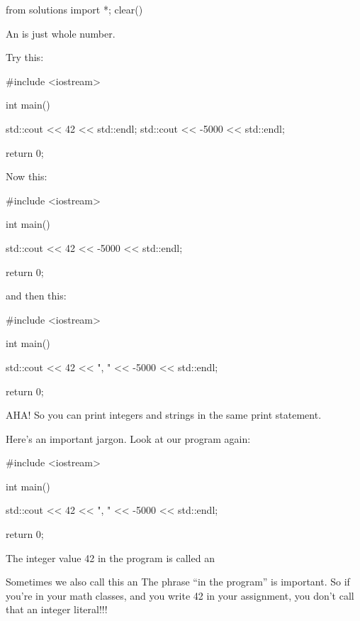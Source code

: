 \begin{python0}
from solutions import *; clear()
\end{python0}

An  is just whole number.

Try this:
\begin{console}
#include <iostream>
  
int main()
{
    std::cout << 42 << std::endl;
    std::cout << -5000 << std::endl;
    
    return 0;
}
\end{console}

Now this:
\begin{console}
#include <iostream>
  
int main()
{
    std::cout << 42 << -5000 << std::endl;
    
    return 0;
}
\end{console}

and then this:
\begin{console}
#include <iostream>
  
int main()
{
    std::cout << 42 << ", " << -5000 << std::endl;
    
    return 0;
}
\end{console}

AHA! So you can print integers and strings in the same print statement.

%

%

Here's an important jargon. Look at our program again:

\begin{console}
#include <iostream>
  
int main()
{
    std::cout << 42 << ", " << -5000 << std::endl;
    
    return 0;
}
\end{console}

The integer value 42 in the program is called an 


Sometimes we also call this an  The phrase
“in the program” is important. So if you're in your math classes, and you
write 42 in your assignment, you don't call that an integer literal!!!

